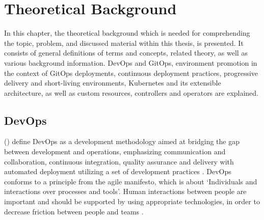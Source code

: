 \chapter{Theoretical Background} 	%
\label{theoretical-background}


In this chapter,
the theoretical background which is needed for comprehending the topic, problem,
and discussed material
within this thesis,
is presented.
It consists of general definitions of terms and concepts,
related theory,
as well as various background information.
DevOps and GitOps,
environment promotion in the context of GitOps deployments,
continuous deployment practices,
progressive delivery and short-living environments,
Kubernetes and its extensible architecture,
as well as
custom resources, controllers and operators
are explained.





\section{DevOps}

\citeauthor{devopsDefinition2016} (\citeyear{devopsDefinition2016})
define DevOps as
a development methodology aimed at bridging the gap between
development and operations, emphasizing communication and collaboration,
continuous integration, quality assurance and delivery with automated deployment
utilizing a set of development practices
\autocite{devopsDefinition2016}.
DevOps conforms to a principle from the agile manifesto,
which is about
\enquote*{Individuals and interactions over processes and tools}.
\autocite{agileManifestoFowler2001agile}
Human interactions between people are important
and should be supported by using appropriate technologies,
in order to decrease friction between people and teams
\autocite{practicalDevopsVerona2018practical}.

